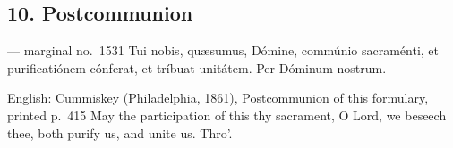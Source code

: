 
\elementguard
\subsection*{10. Postcommunion }

\begin{appointedlatin}{ --- marginal no.\ 1531}
Tui nobis, quæsumus, Dómine, commúnio sacraménti, et purificatiónem cónferat,
et tríbuat unitátem. Per Dóminum nostrum.
\end{appointedlatin}

\begin{namedtranslation}{English: Cummiskey (Philadelphia, 1861), Postcommunion of this formulary, printed p.~415}
May the participation of this thy sacrament, O Lord, we beseech thee, both
purify us, and unite us. Thro'.
\end{namedtranslation}

\clearpage
